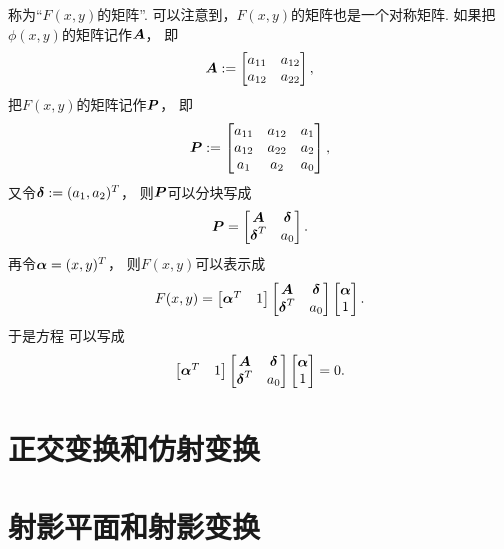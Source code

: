 称为“\(F(x,y)\)的矩阵”.
可以注意到，\(F(x,y)\)的矩阵也是一个对称矩阵.
如果把\(\phi(x,y)\)的矩阵记作\(\boldsymbol{A}\)，
即\begin{equation*}
	\boldsymbol{A} := \begin{bmatrix}
		a_{11} & a_{12} \\
		a_{12} & a_{22}
	\end{bmatrix},
\end{equation*}
把\(F(x,y)\)的矩阵记作\(\boldsymbol{P}\)，
即\begin{equation*}
	\boldsymbol{P} := \begin{bmatrix}
		a_{11} & a_{12} & a_1 \\
		a_{12} & a_{22} & a_2 \\
		a_1 & a_2 & a_0
	\end{bmatrix},
\end{equation*}
又令\(\boldsymbol\delta := (a_1,a_2)^T\)，
则\(\boldsymbol{P}\)可以分块写成\begin{equation*}
	\boldsymbol{P}
	= \begin{bmatrix}
		\boldsymbol{A} & \boldsymbol\delta \\
		\boldsymbol\delta^T & a_0
	\end{bmatrix}.
\end{equation*}
再令\(\boldsymbol\alpha = (x,y)^T\)，
则\(F(x,y)\)可以表示成\begin{equation*}
	F(x,y)
	= \begin{bmatrix}
		\boldsymbol\alpha^T & 1
	\end{bmatrix}
	\begin{bmatrix}
		\boldsymbol{A} & \boldsymbol\delta \\
		\boldsymbol\delta^T & a_0
	\end{bmatrix}
	\begin{bmatrix}
		\boldsymbol\alpha \\ 1
	\end{bmatrix}.
\end{equation*}
于是方程  可以写成
\begin{equation}\label{equation:二次曲线方程.平面二次曲线的一般方程.矩阵形式}
	\begin{bmatrix}
		\boldsymbol\alpha^T & 1
	\end{bmatrix}
	\begin{bmatrix}
		\boldsymbol{A} & \boldsymbol\delta \\
		\boldsymbol\delta^T & a_0
	\end{bmatrix}
	\begin{bmatrix}
		\boldsymbol\alpha \\ 1
	\end{bmatrix}
	= 0.
\end{equation}
\endgroup







\chapter{正交变换和仿射变换}

\chapter{射影平面和射影变换}

% 
